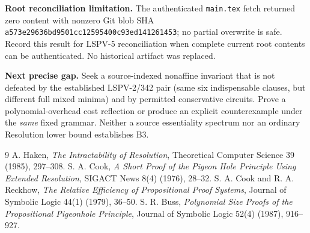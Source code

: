 \documentclass[11pt]{article}
\begin{document}
\noindent\textbf{Root reconciliation limitation.} The authenticated \texttt{main.tex} fetch returned zero content with nonzero Git blob SHA \texttt{a573e29636bd9501cc12595400c93ed141261453}; no partial overwrite is safe. Record this result for LSPV-5 reconciliation when complete current root contents can be authenticated. No historical artifact was replaced.

\noindent\textbf{Next precise gap.} Seek a source-indexed nonaffine invariant that is not defeated by the established LSPV-2/342 pair (same six indispensable clauses, but different full mixed minima) and by permitted conservative circuits. Prove a polynomial-overhead cost reflection or produce an explicit counterexample under the \emph{same} fixed grammar. Neither a source essentiality spectrum nor an ordinary Resolution lower bound establishes B3.

\begin{thebibliography}{9}
 A. Haken, \emph{The Intractability of Resolution}, Theoretical Computer Science 39 (1985), 297--308.
 S. A. Cook, \emph{A Short Proof of the Pigeon Hole Principle Using Extended Resolution}, SIGACT News 8(4) (1976), 28--32.
 S. A. Cook and R. A. Reckhow, \emph{The Relative Efficiency of Propositional Proof Systems}, Journal of Symbolic Logic 44(1) (1979), 36--50.
 S. R. Buss, \emph{Polynomial Size Proofs of the Propositional Pigeonhole Principle}, Journal of Symbolic Logic 52(4) (1987), 916--927.
\end{thebibliography}
\end{document}
